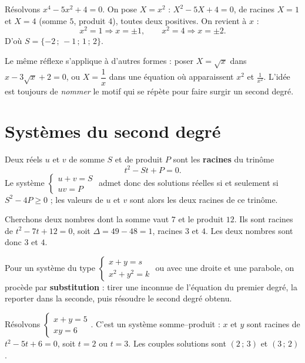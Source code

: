 \begin{exemple}
Résolvons $x^4-5x^2+4=0$. On pose $X=x^2$ : $X^2-5X+4=0$, de racines $X=1$ et $X=4$
(somme $5$, produit $4$), toutes deux positives. On revient à $x$ :
\[ x^2=1\Rightarrow x=\pm 1, \qquad x^2=4\Rightarrow x=\pm 2. \]
D'où $S=\{-2\,;\,-1\,;\,1\,;\,2\}$.
\end{exemple}

\begin{remarque}
Le même réflexe s'applique à d'autres formes : poser $X=\sqrt{x}$ dans
$x-3\sqrt{x}+2=0$, ou $X=\dfrac{1}{x}$ dans une équation où apparaissent $x^2$ et
$\frac{1}{x^2}$. L'idée est toujours de \emph{nommer} le motif qui se répète pour
faire surgir un second degré.
\end{remarque}

\section{Systèmes du second degré}

\begin{theoreme}
Deux réels $u$ et $v$ de somme $S$ et de produit $P$ sont les \textbf{racines} du
trinôme
\[ t^2-St+P=0. \]
Le système $\begin{cases} u+v=S\\ uv=P \end{cases}$ admet donc des solutions réelles
si et seulement si $S^2-4P\ge 0$ ; les valeurs de $u$ et $v$ sont alors les deux
racines de ce trinôme.
\end{theoreme}

\begin{exemple}
Cherchons deux nombres dont la somme vaut $7$ et le produit $12$. Ils sont racines
de $t^2-7t+12=0$, soit $\Delta=49-48=1$, racines $3$ et $4$. Les deux nombres sont
donc $3$ et $4$.
\end{exemple}

\begin{aretenir}
Pour un système du type $\begin{cases} x+y=s\\ x^2+y^2=k \end{cases}$ ou avec une
droite et une parabole, on procède par \textbf{substitution} : tirer une inconnue de
l'équation du premier degré, la reporter dans la seconde, puis résoudre le second
degré obtenu.
\end{aretenir}

\begin{exemple}
Résolvons $\begin{cases} x+y=5\\ xy=6 \end{cases}$. C'est un système
somme--produit : $x$ et $y$ sont racines de $t^2-5t+6=0$, soit $t=2$ ou $t=3$.
Les couples solutions sont $(2\,;\,3)$ et $(3\,;\,2)$.
\end{exemple}

